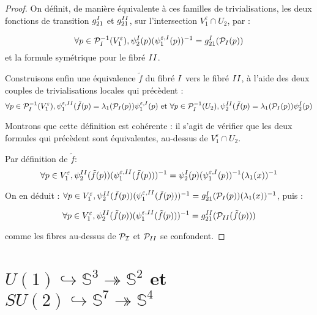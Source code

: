 \begin{proof}
\par
On définit, de manière équivalente à ces familles de trivialisations, %
les deux fonctions de transition $g_{21}^{\Rom{1}}$ et $g_{21}^{\Rom{2}}$, sur l'intersection $V_1^{\varepsilon} \cap U_2$, par :

\[\forall p \in \mathcal{P}_{\Rom{1}}^{-1}(V_1^{\varepsilon}) , \psi_2^{\Rom{1}}(p) (\psi_1^{\varepsilon ,\Rom{1}}(p))^{-1} = g_{21}^{\Rom{1}}(\mathcal{P}_{\Rom{1}}(p))\]
et la formule symétrique pour le fibré $\Rom{2}$.

\par
Construisons enfin une équivalence $\tilde{f}$ du fibré $\Rom{1}$ vers le fibré $\Rom{2}$, à l'aide des deux couples de trivialisations locales qui précèdent :
\[\forall p \in \mathcal{P}_{\Rom{1}}^{-1}(V_1^{\varepsilon}) , \psi_1^{\varepsilon ,\Rom{2}}(\tilde{f}(p) = \lambda_1(\mathcal{P}_{\Rom{1}}(p)) \psi_1^{\varepsilon , \Rom{1}}(p)%
\text{ et }%
\forall p \in \mathcal{P}_{\Rom{1}}^{-1}(U_2) , \psi_2^{\Rom{2}}(\tilde{f}(p) = \lambda_1(\mathcal{P}_I(p)) \psi_2^{\Rom{1}}(p)\]

Montrons que cette définition est cohérente : il s'agit de vérifier que les deux formules qui précèdent sont équivalentes, au-dessus de $V_1^{\varepsilon} \cap U_2$.

\par
Par définition de $\tilde{f}$:
\[\forall p \in V_1^{\varepsilon} , \psi_2^{\Rom{2}}(\tilde{f}(p))(\psi_1^{\varepsilon , \Rom{2}}(\tilde{f}(p)))^{-1} = \psi_2^{\Rom{1}}(p) (\psi_1^{\varepsilon ,\Rom{1}}(p))^{-1} (\lambda_1(x))^{-1}\]

On en d\'eduit : $\forall p \in V_1^{\varepsilon} , \psi_2^{\Rom{2}}(\tilde{f}(p))(\psi_1^{\varepsilon ,\Rom{2}}(\tilde{f}(p)))^{-1} = g_{21}^{\Rom{1}}(\mathcal{P}_{\Rom{1}}(p))(\lambda_1(x))^{-1}$, puis :

\[\forall p \in V_1^{\varepsilon} , \psi_2^{\Rom{2}}(\tilde{f}(p))(\psi_1^{\varepsilon ,\Rom{2}}(\tilde{f}(p)))^{-1} = g_{21}^{\Rom{2}}(\mathcal{P}_{\Rom{2}}(\tilde{f}(p)))\]

comme les fibres au-dessus de $\mathcal{P_{\Rom{1}}}$ et $\mathcal{P}_{\Rom{2}}$ se confondent.
\end{proof}

\section{$U(1)\hookrightarrow\mathbb{S}^3\twoheadrightarrow\mathbb{S}^2$ et $SU(2)\hookrightarrow\mathbb{S}^7\twoheadrightarrow\mathbb{S}^4$}

